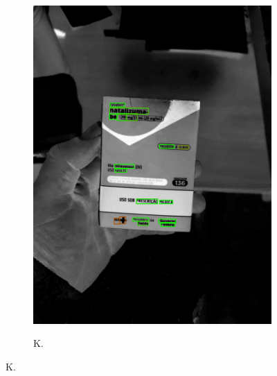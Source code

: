 \begin{figure}[htb]
\begin{subfigure}[t]{0.21\textwidth}
        \includegraphics[width=\linewidth]{../pictures/tysabri_cmyk_y_only_boxes.jpg}
    \end{subfigure}
    \hfill
    \begin{subfigure}[t]{0.21\textwidth}
        \centering
        \caption{K.}
        \label{fig:foto:versoes:2:K:boxes}

\end{subfigure}
\end{figure}
